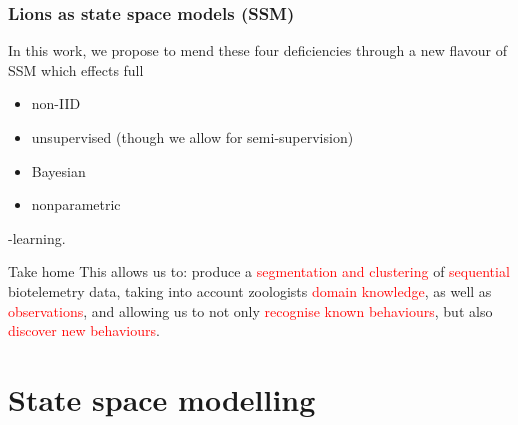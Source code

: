 \documentclass[aspectratio=169]{beamer}
\begin{document}

\begin{frame}
    \frametitle{Lions as state space models (SSM)}

    In this work, we propose to mend these four deficiencies through a new flavour of SSM which effects full

    \begin{itemize}
        \item non-IID
        \item unsupervised (though we allow for semi-supervision)
        \item Bayesian
        \item nonparametric
    \end{itemize}
    -learning.

    \begin{block}{Take home}
        This allows us to: produce a \textcolor{red}{segmentation and clustering} of \textcolor{red}{sequential} biotelemetry data, taking into account zoologists \textcolor{red}{domain knowledge}, as well as \textcolor{red}{observations}, and allowing us to not only \textcolor{red}{recognise known behaviours}, but also \textcolor{red}{discover new behaviours}.
    \end{block}


\end{frame}


\section{State space modelling}
\end{document}
